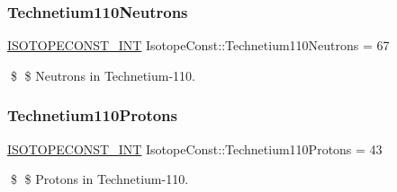 \subsubsection{\texorpdfstring{Technetium110\+Neutrons}{Technetium110Neutrons}}
{\footnotesize\ttfamily \mbox{\hyperlink{group___isotope_const-_macros_ga5f18360b3e99483a35c32d789e62621c}{I\+S\+O\+T\+O\+P\+E\+C\+O\+N\+S\+T\+\_\+\+I\+NT}} Isotope\+Const\+::\+Technetium110\+Neutrons = 67}

\$ \$ Neutrons in Technetium-\/110. \mbox{\label{group___isotope_const-_technetium-_tc110_ga1c663d5ef56af6b67f6ce6a025a51c0d}} 
\subsubsection{\texorpdfstring{Technetium110\+Protons}{Technetium110Protons}}
{\footnotesize\ttfamily \mbox{\hyperlink{group___isotope_const-_macros_ga5f18360b3e99483a35c32d789e62621c}{I\+S\+O\+T\+O\+P\+E\+C\+O\+N\+S\+T\+\_\+\+I\+NT}} Isotope\+Const\+::\+Technetium110\+Protons = 43}

\$ \$ Protons in Technetium-\/110. 